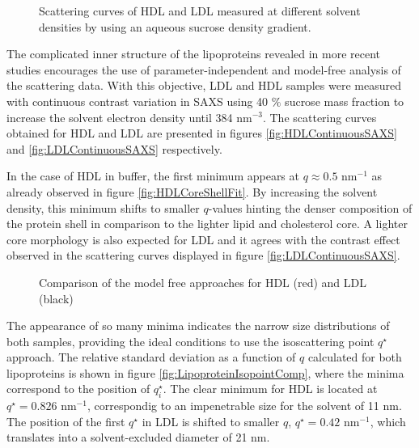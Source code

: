 \begin{figure}
	\centering
		\subfloat[HDL]{\resizebox{0.44\linewidth}{!}{}\label{fig:HDLContinuousSAXS}}
		\subfloat[LDL]{\resizebox{0.44\linewidth}{!}{}\label{fig:LDLContinuousSAXS}}
		\caption{Scattering curves of HDL and LDL measured at different solvent densities by using an aqueous sucrose density gradient.}
\end{figure}

The complicated inner structure of the lipoproteins revealed in more recent studies \cite{baumstark_structure_1990,schnitzer_re-evaluation_1994} encourages the use of parameter-independent and model-free analysis of the scattering data. With this objective, LDL and HDL samples were measured with continuous contrast variation in SAXS using 40 $\%$ sucrose mass fraction to increase the solvent electron density until 384 nm$^{-3}$. The scattering curves obtained for HDL and LDL are presented in figures \ref{fig:HDLContinuousSAXS} and \ref{fig:LDLContinuousSAXS} respectively.

In the case of HDL in buffer, the first minimum appears at $q\approx0.5$ nm$^{-1}$ as already observed in figure \ref{fig:HDLCoreShellFit}. By increasing the solvent density, this minimum shifts to smaller $q$-values hinting the denser composition of the protein shell in comparison to the lighter lipid and cholesterol core. A lighter core morphology is also expected for LDL \cite{luzzati_structure_1979} and it agrees with the contrast effect observed in the scattering curves displayed in figure \ref{fig:LDLContinuousSAXS}.

\begin{figure}
	\centering
		\caption{Comparison of the model free approaches for HDL (red) and LDL (black)}
\end{figure}

The appearance of so many minima indicates the narrow size distributions of both samples, providing the ideal conditions to use the isoscattering point $q^{\star}$ approach. The relative standard deviation as a function of $q$ calculated for both lipoproteins is shown in figure \ref{fig:LipoproteinIsopointComp}, where the minima correspond to the position of $q^{\star}_i$. The clear minimum for HDL is located at $q^{\star}=0.826$ nm$^{-1}$, correspondig to an impenetrable size for the solvent of 11 nm. The position of the first $q^{\star}$ in LDL is shifted to smaller $q$, $q^{\star}=0.42$ nm$^{-1}$, which translates into a solvent-excluded diameter of 21 nm.

